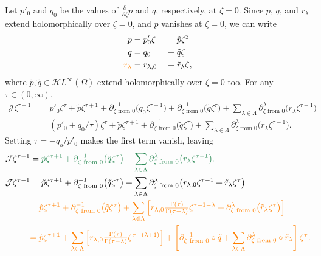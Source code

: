 \documentclass{article}
\theoremstyle{plain}
\newcommand{\holoL}[1]{\mathcal{H}L^{#1}} %
\begin{document}
Let $p'_0$ and $q_0$ be the values of $\tfrac{\partial}{\partial \zeta} p$ and $q$, respectively, at $\zeta = 0$. Since $p$, $q$, and $r_\lambda$ extend holomorphically over $\zeta = 0$, and $p$ vanishes at $\zeta = 0$, we can write
\begin{alignat*}{2}
p & = p'_0 \zeta &\;+\;& \tilde{p} \zeta^2 \\
q & = q_0 &\;+\;& \tilde{q} \zeta \\
\textcolor{orange}{r_\lambda} & = r_{\lambda,0} &\;+\;& \tilde{r}_\lambda \zeta,
\end{alignat*}
where $\tilde{p}, \tilde{q} \in \holoL{\infty}(\Omega)$ extend holomorphically over $\zeta = 0$ too. For any $\tau \in (0, \infty)$,
\begin{align*}
\mathcal{J} \zeta^{\tau-1} & = p'_0 \zeta^\tau + \tilde{p} \zeta^{\tau+1} + \partial^{-1}_{\zeta \text{ from } 0}\big(q_0 \zeta^{\tau-1}\big) + \partial^{-1}_{\zeta \text{ from } 0}\big(\tilde{q} \zeta^\tau\big) + \sum_{\lambda \in \Lambda} \partial^\lambda_{\zeta \text{ from } 0} \big(r_\lambda \zeta^{\tau-1}\big) \\
& = (p'_0 + q_0/\tau)\zeta^\tau + \tilde{p} \zeta^{\tau+1} + \partial^{-1}_{\zeta \text{ from } 0}\big(\tilde{q} \zeta^\tau\big) + \sum_{\lambda \in \Lambda} \partial^\lambda_{\zeta \text{ from } 0} \big(r_\lambda \zeta^{\tau-1}\big).
\end{align*}
Setting $\tau = -q_o / p'_0$ makes the first term vanish, leaving
\begin{align*}
\mathcal{J} \zeta^{\tau-1} & = \textcolor{SeaGreen}{\tilde{p} \zeta^{\tau+1} + \partial^{-1}_{\zeta \text{ from } 0}\big(\tilde{q} \zeta^\tau\big) + \sum_{\lambda \in \Lambda} \partial^\lambda_{\zeta \text{ from } 0} \big(r_\lambda \zeta^{\tau-1}\big).} \\
\mathcal{J} \zeta^{\tau-1} & = \tilde{p} \zeta^{\tau+1} + \partial^{-1}_{\zeta \text{ from } 0}\big(\tilde{q} \zeta^\tau\big) + \sum_{\lambda \in \Lambda} \partial^\lambda_{\zeta \text{ from } 0} \big(r_{\lambda,0} \zeta^{\tau-1} + \tilde{r}_\lambda \zeta^\tau\big) \\
& \textcolor{orange}{= \tilde{p} \zeta^{\tau+1} + \partial^{-1}_{\zeta \text{ from } 0}\big(\tilde{q} \zeta^\tau\big) + \sum_{\lambda \in \Lambda} \left[ r_{\lambda,0} \tfrac{\Gamma(\tau)}{\Gamma(\tau-\lambda)} \zeta^{\tau-1-\lambda} + \partial^\lambda_{\zeta \text{ from } 0} \big(\tilde{r}_\lambda \zeta^\tau\big) \right]} \\
& \textcolor{orange}{= \tilde{p} \zeta^{\tau+1} + \sum_{\lambda \in \Lambda} \left[ r_{\lambda,0} \tfrac{\Gamma(\tau)}{\Gamma(\tau-\lambda)} \zeta^{\tau-(\lambda+1)} \right] + \left[ \partial^{-1}_{\zeta \text{ from } 0} \circ \tilde{q} + \sum_{\lambda \in \Lambda} \partial^\lambda_{\zeta \text{ from } 0} \circ \tilde{r}_\lambda \right] \zeta^\tau.}
\end{align*}
\end{document}
